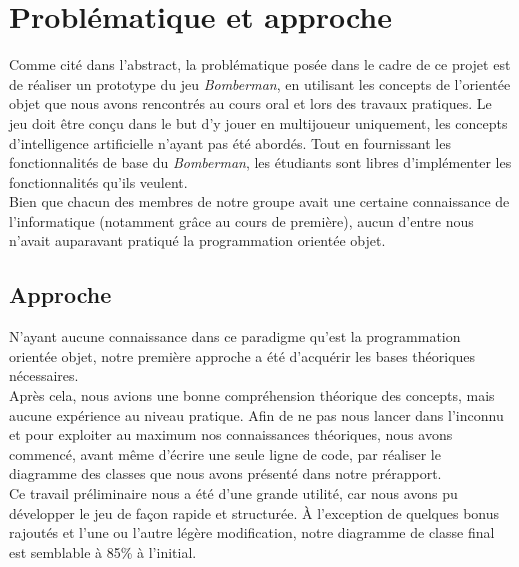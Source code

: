 \newpage
\section{Problématique et approche}
Comme cité dans l'abstract, la problématique posée dans le cadre de ce projet est de réaliser un prototype du jeu \textit{Bomberman}, en utilisant les concepts de l'orientée objet que nous avons rencontrés au cours oral et lors des travaux pratiques. Le jeu doit être conçu dans le but d'y jouer en multijoueur uniquement, les concepts d'intelligence artificielle n'ayant pas été abordés. Tout en fournissant les fonctionnalités de base du \textit{Bomberman}, les étudiants sont libres d'implémenter les fonctionnalités qu'ils veulent. \\
Bien que chacun des membres de notre groupe avait une certaine 
connaissance de l'informatique (notamment grâce au cours de 
première), aucun d'entre nous n'avait auparavant pratiqué la  programmation orientée objet.


	\subsection{Approche}
	N'ayant aucune connaissance dans ce paradigme qu'est la 
	programmation orientée objet, notre première approche
	a été d'acquérir les bases théoriques nécessaires.\\
	Après cela, nous avions une bonne compréhension
	théorique des concepts, mais aucune expérience au niveau 
	pratique. Afin de ne pas nous lancer dans l'inconnu et pour 
	exploiter au maximum nos connaissances théoriques, nous avons 
	commencé, avant même d'écrire une seule ligne de code, par 
	réaliser le diagramme des classes que nous avons présenté 
	dans notre prérapport.\\
	Ce travail préliminaire nous a été d'une grande utilité, car 
	nous avons pu développer le jeu de façon rapide et structurée.
	À l'exception de quelques bonus rajoutés et l'une ou l'autre
	légère modification, notre diagramme de classe final est 
	semblable à 85\% à l'initial.\\
	
